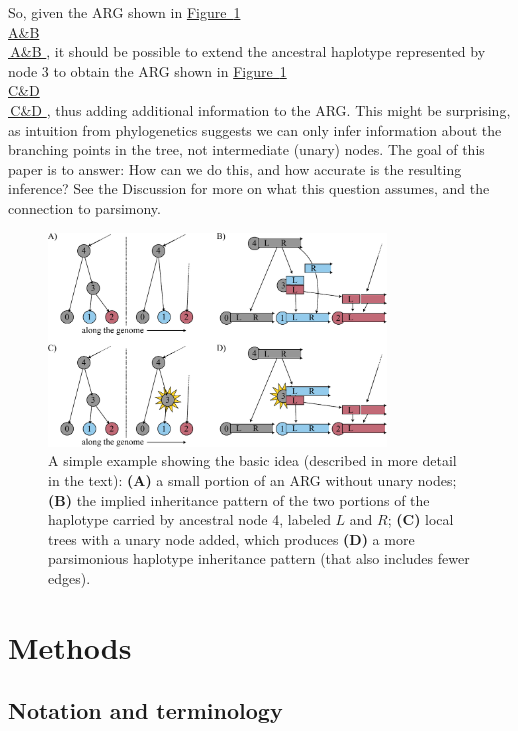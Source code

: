 \documentclass[10pt,twoside,lineno]{gsajnl}
\newcommand*{\figref}[2][]{%
	\hyperref[{#2}]{%
		Figure~\ref*{#2}%
		\ifx\\#1\\%
		\else
		\,#1%
		\fi
	}%
}
\begin{document}
So, given the ARG shown in \figref[A\&B]{fig:conceptual},
it should be possible to extend the ancestral haplotype represented by node 3
to obtain the ARG shown in \figref[C\&D]{fig:conceptual},
thus adding additional information to the ARG.
This might be surprising,
as intuition from phylogenetics suggests we can only infer
information about the branching points in the tree, not intermediate (unary) nodes.
The goal of this paper is to answer:
How can we do this, and how accurate is the resulting inference?
See the Discussion for more on what this question assumes,
and the connection to parsimony. 

\begin{figure}
    \begin{center}
    \includegraphics[width=0.8\textwidth]{figures/conceptual_figure.pdf}
    \end{center}
    \caption{
        A simple example showing the basic idea
        (described in more detail in the text):
        \textbf{(A)} a small portion of an ARG without unary nodes;
        \textbf{(B)} the implied inheritance pattern of the two portions of the haplotype carried by ancestral node 4,
        labeled $L$ and $R$;
        \textbf{(C)} local trees with a unary node added,
        which produces \textbf{(D)} a more parsimonious haplotype inheritance pattern
        (that also includes fewer edges).
        \label{fig:conceptual}
    }
\end{figure}

\section{Methods}

\subsection{Notation and terminology}
\end{document}
